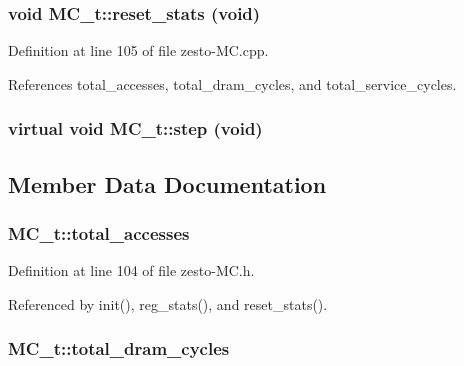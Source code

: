 \subsubsection[{reset\_\-stats}]{\setlength{\rightskip}{0pt plus 5cm}void MC\_\-t::reset\_\-stats (void)\hspace{0.3cm}{\tt  [virtual]}}\label{classMC__t_069ec7d792e21f8c6b4d41d9549e1b68}




Definition at line 105 of file zesto-MC.cpp.

References total\_\-accesses, total\_\-dram\_\-cycles, and total\_\-service\_\-cycles.
\subsubsection[{step}]{\setlength{\rightskip}{0pt plus 5cm}virtual void MC\_\-t::step (void)\hspace{0.3cm}{\tt  [pure virtual]}}\label{classMC__t_d06218ce591c673ccec29f557b1f5e89}




\subsection{Member Data Documentation}
\subsubsection[{total\_\-accesses}]{ {\bf MC\_\-t::total\_\-accesses}\hspace{0.3cm}{\tt  [protected]}}\label{classMC__t_a20de7b62f2eb23b37286e59d7ffa32e}




Definition at line 104 of file zesto-MC.h.

Referenced by init(), reg\_\-stats(), and reset\_\-stats().
\subsubsection[{total\_\-dram\_\-cycles}]{ {\bf MC\_\-t::total\_\-dram\_\-cycles}\hspace{0.3cm}{\tt  [protected]}}\label{classMC__t_ea8992387c70b92dbb075f5da8f1406e}




